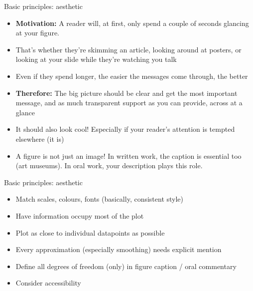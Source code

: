 \documentclass[10pt]{beamer}
\begin{document}
\begin{frame}{Basic principles: aesthetic}
    \begin{itemize}[<+->]
    \item \textbf{Motivation:} A reader will, at first, only spend a couple of seconds glancing at your figure.
      \item That's whether they're skimming an article, looking around at posters, or looking at your slide while they're watching you talk
      \item Even if they spend longer, the easier the messages come through, the better
      \item \textbf{Therefore:} The big picture should be clear and get the most important message, and as much transparent support as you can provide, across at a glance
        \item It should also look cool! Especially if your reader's attention is tempted elsewhere (it is)
      \item A figure is not just an image! In written work, the caption is essential too (art museums). In oral work, your description plays this role.
      \end{itemize}
\end{frame}


\begin{frame}{Basic principles: aesthetic}
    \begin{itemize}
    \item Match scales, colours, fonts (basically, consistent style)
    \item Have information occupy most of the plot
    \item Plot as close to individual datapoints as possible
    \item Every approximation (especially smoothing) needs explicit mention
    \item Define all degrees of freedom (only) in figure caption / oral commentary
      \item Consider accessibility
  \end{itemize}
\end{frame}
\end{document}
